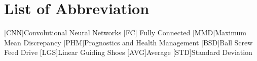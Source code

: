 
\chapter{List of Abbreviation}


\begin{acronym}[EuGH]
[CNN]{Convolutional Neural Networks}
[FC] {Fully Connected}
[MMD]{Maximum Mean Discrepancy}
[PHM]{Prognostics and Health
Management}
[BSD]{Ball Screw Feed Drive}
[LGS]{Linear Guiding Shoes}
[AVG]{Average}
[STD]{Standard Deviation}
\end{acronym}
